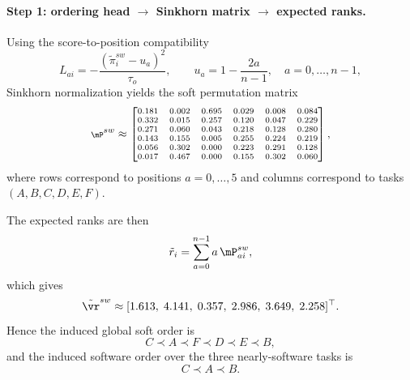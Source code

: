 \paragraph{\textbf{Step 1: ordering head \(\rightarrow\) Sinkhorn matrix \(\rightarrow\) expected ranks.}}
Using the score-to-position compatibility
\begin{equation}
L_{ai} = -\frac{(\tilde{\pi}_i^{sw}-u_a)^2}{\tau_o},
\qquad
u_a = 1-\frac{2a}{n-1},
\quad a=0,\ldots,n-1,
\end{equation}
Sinkhorn normalization yields the soft permutation matrix
\begingroup
\setlength{\arraycolsep}{3pt}
\begin{equation}
\scriptsize
\mP^{sw}\approx
\begin{bmatrix}
0.181 & 0.002 & 0.695 & 0.029 & 0.008 & 0.084\\
0.332 & 0.015 & 0.257 & 0.120 & 0.047 & 0.229\\
0.271 & 0.060 & 0.043 & 0.218 & 0.128 & 0.280\\
0.143 & 0.155 & 0.005 & 0.255 & 0.224 & 0.219\\
0.056 & 0.302 & 0.000 & 0.223 & 0.291 & 0.128\\
0.017 & 0.467 & 0.000 & 0.155 & 0.302 & 0.060
\end{bmatrix},
\end{equation}
\endgroup
where rows correspond to positions \(a=0,\ldots,5\) and columns correspond to tasks \((A,B,C,D,E,F)\).

The expected ranks are then
\begin{equation}
\tilde r_i=\sum_{a=0}^{n-1} a\,\mP^{sw}_{ai},
\end{equation}
which gives
\begin{equation}
\tilde{\vr}^{sw}\approx
[1.613,\;4.141,\;0.357,\;2.986,\;3.649,\;2.258]^\top.
\end{equation}
Hence the induced global soft order is
\[
C \prec A \prec F \prec D \prec E \prec B,
\]
and the induced software order over the three nearly-software tasks is
\[
C \prec A \prec B.
\]

